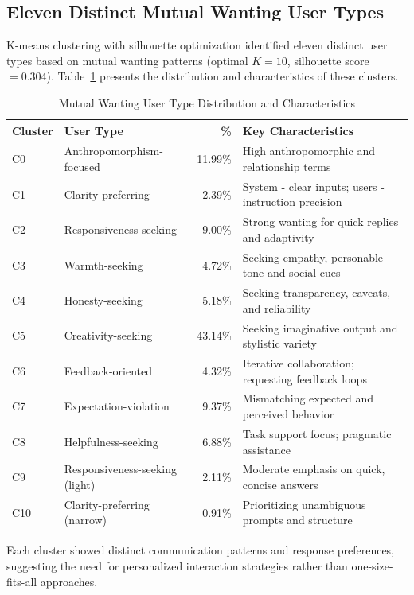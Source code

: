 \documentclass{article}
\begin{document}
\subsection{Eleven Distinct Mutual Wanting User Types}

K-means clustering with silhouette optimization identified eleven distinct user types based on mutual wanting patterns (optimal $K=10$, silhouette score $=0.304$). Table~\ref{tab:user_clusters} presents the distribution and characteristics of these clusters.

\begin{table}[htbp]
\centering
\label{tab:user_clusters}
\begin{tabular}{@{}llrp{7cm}@{}}
\toprule
Cluster & User Type & \% & Key Characteristics \\
\midrule
C0 & Anthropomorphism-focused & 11.99\% & High anthropomorphic and relationship terms \\
C1 & Clarity-preferring & 2.39\% & System - clear inputs; users - instruction precision \\
C2 & Responsiveness-seeking & 9.00\% & Strong wanting for quick replies and adaptivity \\
C3 & Warmth-seeking & 4.72\% & Seeking empathy, personable tone and social cues \\
C4 & Honesty-seeking & 5.18\% & Seeking transparency, caveats, and reliability \\
C5 & Creativity-seeking & 43.14\% & Seeking imaginative output and stylistic variety \\
C6 & Feedback-oriented & 4.32\% & Iterative collaboration; requesting feedback loops \\
C7 & Expectation-violation & 9.37\% & Mismatching expected and perceived behavior \\
C8 & Helpfulness-seeking & 6.88\% & Task support focus; pragmatic assistance \\
C9 & Responsiveness-seeking (light) & 2.11\% & Moderate emphasis on quick, concise answers \\
C10 & Clarity-preferring (narrow) & 0.91\% & Prioritizing unambiguous prompts and structure \\
\bottomrule
\end{tabular}
\caption{Mutual Wanting User Type Distribution and Characteristics}
\end{table}

Each cluster showed distinct communication patterns and response preferences, suggesting the need for personalized interaction strategies rather than one-size-fits-all approaches.
\end{document}
